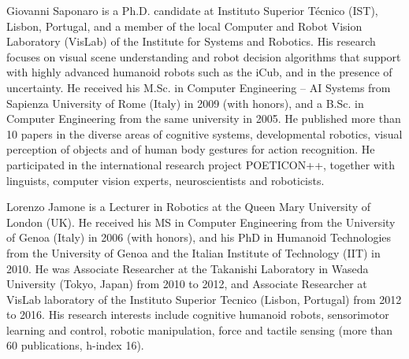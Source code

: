 
\begin{IEEEbiography}{Giovanni Saponaro}
  is a Ph.D. candidate at Instituto Superior Técnico (IST), Lisbon, Portugal, and a member of the local Computer and Robot Vision Laboratory (VisLab) of the Institute for Systems and Robotics. His research focuses on visual scene understanding and robot decision algorithms that support \hri{} with highly advanced humanoid robots such as the iCub, and in the presence of uncertainty. He received his M.Sc. in Computer Engineering -- \acl{AI} Systems from Sapienza University of Rome (Italy) in 2009 (with honors), and a B.Sc. in Computer Engineering from the same university in 2005. He published more than 10 papers in the diverse areas of cognitive systems, developmental robotics, visual perception of objects and of human body gestures for action recognition. He participated in the international research project POETICON++, together with linguists, computer vision experts, neuroscientists and roboticists.
\end{IEEEbiography}

\begin{IEEEbiography}{Lorenzo Jamone}
  is a Lecturer in Robotics at the Queen Mary University of London (UK). He received his MS in Computer Engineering from the University of Genoa (Italy) in 2006 (with honors), and his PhD in Humanoid Technologies from the University of Genoa and the Italian Institute of Technology (IIT) in 2010. He was Associate Researcher at the Takanishi Laboratory in Waseda University (Tokyo, Japan) from 2010 to 2012, and Associate Researcher at VisLab laboratory of the Instituto Superior Tecnico (Lisbon, Portugal) from 2012 to 2016. His research interests include cognitive humanoid robots, sensorimotor learning and control, robotic manipulation, force and tactile sensing (more than 60 publications, h-index 16).
\end{IEEEbiography}

